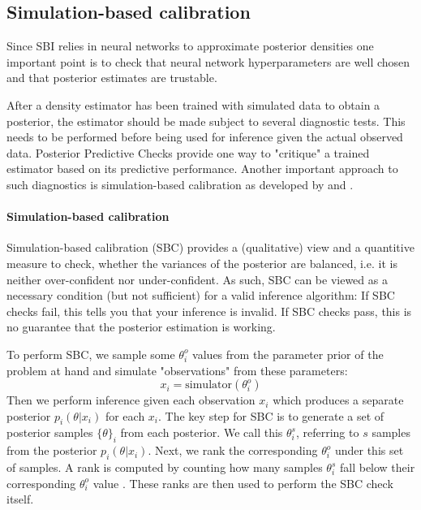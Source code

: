 \documentclass{aa}
\begin{document}
\begin{appendix}
\section{Simulation-based calibration}
\label{sec:sbc}

Since SBI relies in neural networks to approximate posterior densities one important point is to check that neural network hyperparameters are well chosen and that posterior estimates are trustable.

After a density estimator has been trained with simulated data to obtain a posterior, the estimator should be made subject to several diagnostic tests. This needs to be performed before being used for inference given the actual observed data. Posterior Predictive Checks provide one way to "critique" a trained estimator based on its predictive performance. Another important approach to such diagnostics is simulation-based calibration as developed by \citet{Cook2006} and \citet{Talts2018}. 

\paragraph{Simulation-based calibration}
Simulation-based calibration (SBC) provides a (qualitative) view and a quantitive measure to check, whether the variances of the posterior are balanced, i.e. it is neither over-confident nor under-confident. As such, SBC can be viewed as a necessary condition (but not sufficient) for a valid inference algorithm: If SBC checks fail, this tells you that your inference is invalid. If SBC checks pass, this is no guarantee that the posterior estimation is working.

To perform SBC, we sample some $\theta_i^o$ values from the parameter prior of the problem at hand and simulate "observations" from these parameters: 
\begin{equation}
    x_i = \text{simulator}(\theta_i^o)
\end{equation}
Then we perform inference given each observation $x_i$ which produces a separate posterior $p_i(\theta|x_i)$ for each $x_i$. The key step for SBC is to generate a set of posterior samples $\{\theta\}_i$ from each posterior. We call this $\theta_i^s$, referring to $s$ samples from the posterior $p_i(\theta|x_i)$. Next, we rank the corresponding $\theta_i^o$ under this set of samples. A rank is computed by counting how many samples $\theta_i^s$ fall below their corresponding $\theta_i^o$ value \citep[see section 4.1 in][]{Talts2018}. These ranks are then used to perform the SBC check itself.


\end{appendix}
\end{document}
